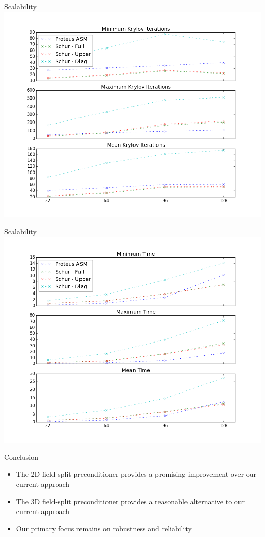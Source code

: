 \documentclass{beamer}
\begin{document}
\begin{frame}{Scalability}
    \includegraphics[width=\textwidth]{figures/marin_iterations_scalability.png}
\end{frame}

\begin{frame}{Scalability}
    \includegraphics[width=\textwidth]{figures/marin_time_scalability.png}
\end{frame}

\begin{frame}{Conclusion}
  \begin{itemize}
  \item The 2D field-split preconditioner provides a promising improvement over
    our current approach
  \item The 3D field-split preconditioner provides a reasonable
    alternative to our current approach
  \item Our primary focus remains on robustness and reliability
  \end{itemize}
\end{frame}
\end{document}
